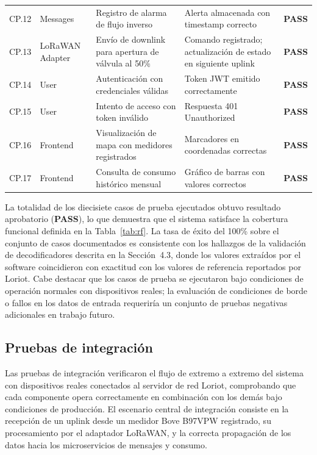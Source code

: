 \documentclass[12pt,a4paper,oneside]{report}
\begin{document}
\begin{longtable}{llp{3.8cm}p{3.0cm}c}
CP.12 & Messages & Registro de alarma de flujo inverso & Alerta almacenada con timestamp correcto & \textbf{PASS} \\
CP.13 & LoRaWAN Adapter & Envío de downlink para apertura de válvula al 50\% & Comando registrado; actualización de estado en siguiente uplink & \textbf{PASS} \\
CP.14 & User & Autenticación con credenciales válidas & Token JWT emitido correctamente & \textbf{PASS} \\
CP.15 & User & Intento de acceso con token inválido & Respuesta 401 Unauthorized & \textbf{PASS} \\
CP.16 & Frontend & Visualización de mapa con medidores registrados & Marcadores en coordenadas correctas & \textbf{PASS} \\
CP.17 & Frontend & Consulta de consumo histórico mensual & Gráfico de barras con valores correctos & \textbf{PASS} \\
\end{longtable}

La totalidad de los diecisiete casos de prueba ejecutados obtuvo resultado aprobatorio (\textbf{PASS}), lo que demuestra que el sistema satisface la cobertura funcional definida en la Tabla~\ref{tab:rf}. La tasa de éxito del 100\% sobre el conjunto de casos documentados es consistente con los hallazgos de la validación de decodificadores descrita en la Sección~4.3, donde los valores extraídos por el software coincidieron con exactitud con los valores de referencia reportados por Loriot. Cabe destacar que los casos de prueba se ejecutaron bajo condiciones de operación normales con dispositivos reales; la evaluación de condiciones de borde o fallos en los datos de entrada requeriría un conjunto de pruebas negativas adicionales en trabajo futuro.

\subsection{Pruebas de integración}\label{subsec:pruebas-integracion}

Las pruebas de integración verificaron el flujo de extremo a extremo del sistema con dispositivos reales conectados al servidor de red Loriot, comprobando que cada componente opera correctamente en combinación con los demás bajo condiciones de producción. El escenario central de integración consiste en la recepción de un uplink desde un medidor Bove B97VPW registrado, su procesamiento por el adaptador LoRaWAN, y la correcta propagación de los datos hacia los microservicios de mensajes y consumo.
\end{document}
